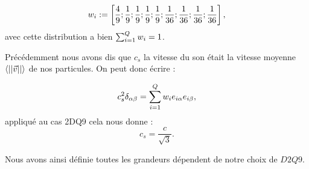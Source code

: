   \begin{equation}
    w_i := \left[\frac{4}{9}; \frac{1}{9}; \frac{1}{9}; \frac{1}{9}; \frac{1}{9}; \frac{1}{36}; \frac{1}{36}; \frac{1}{36}; \frac{1}{36} \right],
  \end{equation}
  avec cette distribution a bien $\sum_{i=1}^Q w_i = 1$.
  
  Précédemment nous avons dis que $c_s$ la vitesse du son était la vitesse moyenne $\left<||\v||\right>$ de nos particules.
  On peut donc écrire :
  
  \begin{equation}
    c_s^2 \delta_{\alpha \beta}= \sum_{i=1}^Q w_i e_{i\alpha} e_{i\beta},
  \end{equation}
  appliqué au cas 2DQ9 cela nous donne :
  \begin{equation} \label{eq:cs}
    c_s = \frac{c}{\sqrt{3}}.
  \end{equation}
  
  Nous avons ainsi définie toutes les grandeurs dépendent de notre choix de $D2Q9$.
  
